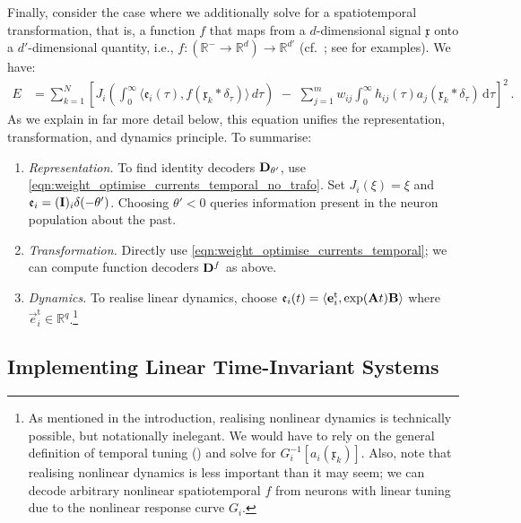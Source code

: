 Finally, consider the case where we additionally solve for a spatiotemporal transformation, that is, a function $f$ that maps from a $d$-dimensional signal $\mathfrak{x}$ onto a $d'$-dimensional quantity, i.e., $f : (\mathbb{R}^- \longrightarrow \mathbb{R}^d) \longrightarrow \mathbb{R}^{d'}$ (cf.~; see  for examples).
We have:
\begin{align}
	E &= \sum_{k = 1}^N \left[
		J_i \left( \! \int_0^\infty \!\!\! \big\langle \mathfrak{e}_i(\tau), f(\mathfrak{x}_k \ast \delta_\tau) \big\rangle \, \mathit{d\tau} \right) \,\,-\,\,
		\sum_{j = 1}^m w_{ij} \! \int_0^\infty \!\!\! h_{ij}(\tau) a_j(\mathfrak{x}_k \ast \delta_\tau) \,\mathrm{d}\tau
	\right]^2 \,.
	\label{eqn:weight_optimise_currents_temporal}
\end{align}
As we explain in far more detail below, this equation unifies the \NEF representation, transformation, and dynamics principle.
To summarise:
\begin{enumerate}[1.]
	\item \emph{Representation.} To find identity decoders $\mathbf{D}_{\theta'}$, use \cref{eqn:weight_optimise_currents_temporal_no_trafo}.
	Set $J_i(\xi) = \xi$ and $\mathfrak{e}_i = (\mathbf{I})_i \delta(-\theta')$.
	Choosing $\theta' < 0$ queries information present in the neuron population about the past.
	\item \emph{Transformation.} Directly use \cref{eqn:weight_optimise_currents_temporal}; we can compute function decoders $\mathbf{D}^f$ as above.
	\item \emph{Dynamics.} To realise linear dynamics, choose $\mathfrak{e}_i(t) = \langle \mathbf{e}^\mathrm{t}_i, \exp(\mathbf{A} t) \mathbf{B} \rangle$ where $\vec e^\mathrm{t}_i \in \mathbb{R}^{q}$.\footnote{As mentioned in the introduction, realising nonlinear dynamics is technically possible, but notationally inelegant. We would have to rely on the general definition of temporal tuning () and solve for $G_i^{-1}[a_i(\mathfrak x_k)]$.
	Also, note that realising nonlinear dynamics is less important than it may seem; we can decode arbitrary nonlinear spatiotemporal $f$ from neurons with linear tuning due to the nonlinear response curve $G_i$.
	}
\end{enumerate}

\pagebreak

\subsection{Implementing Linear Time-Invariant Systems}
\label{sec:temporal_tuning_lti}

